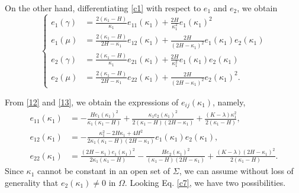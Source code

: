 \documentclass[a4paper,12pt]{amsart}
\theoremstyle{definition}
\begin{document}
On the other hand,   differentiating \eqref{c1} with respect to $e_1$ and $e_2$, we obtain
\begin{equation}\label{13}
\left\{
\begin{split}
e_1(\gamma)&=\frac{2(\kappa_1-H)}{\kappa_1}e_{11}(\kappa_1)+\frac{2H}{\kappa_1^2}e_1(\kappa_1)^2\\
e_1(\mu)&=\frac{2(\kappa_1-H)}{2H-\kappa_1}e_{12}(\kappa_1)+\frac{2H}{(2H-\kappa_1)^2}e_1(\kappa_1)e_2(\kappa_1)\\
e_2(\gamma)&=\frac{2(\kappa_1-H)}{\kappa_1}e_{21}(\kappa_1)+\frac{2H}{\kappa_1^2}e_1(\kappa_1)e_2(\kappa_1)\\
e_2(\mu)&=\frac{2(\kappa_1-H)}{2H-\kappa_1}e_{22}(\kappa_1)+\frac{2H}{(2H-\kappa_1)^2}e_2(\kappa_1)^2.
\end{split}\right.
\end{equation}

 

From \eqref{12} and \eqref{13}, we obtain the expressions of $e_{ij}(\kappa_1)$, namely, 
\begin{subequations}
 \begin{align}
 e_{11}(\kappa_1)&=-\frac{He_1(\kappa_1)^2}{\kappa_1(\kappa_1-H)}+\frac{\kappa_1 e_2(\kappa_1)^2}{2(\kappa_1-H)(2H-\kappa_1)}+\frac{(K-\lambda)\kappa_1^2}{2(\kappa_1-H)},\label{c7}\\
e_{12}(\kappa_1)&=-\frac{\kappa_1^2-2H\kappa_1+4H^2}{2\kappa_1(\kappa_1-H)(2H-\kappa_1)}e_1(\kappa_1)e_2(\kappa_1),\label{c9}\\
e_{22}(\kappa_1)&=\frac{(2H-\kappa_1)e_1(\kappa_1)^2}{2\kappa_1(\kappa_1-H)}-\frac{He_2(\kappa_1)^2}{(\kappa_1-H)(2H-\kappa_1)}+\frac{(K-\lambda)(2H-\kappa_1)^2}{2(\kappa_1-H)}.\label{c10}
\end{align}
\end{subequations}
Since $\kappa_1$ cannot be constant in an open set of $\Sigma$,   we can assume without loss of generality  that $e_2(\kappa_1)\not=0$ in $\Omega$. Looking Eq. \eqref{c7}, we have two possibilities.
\end{document}

